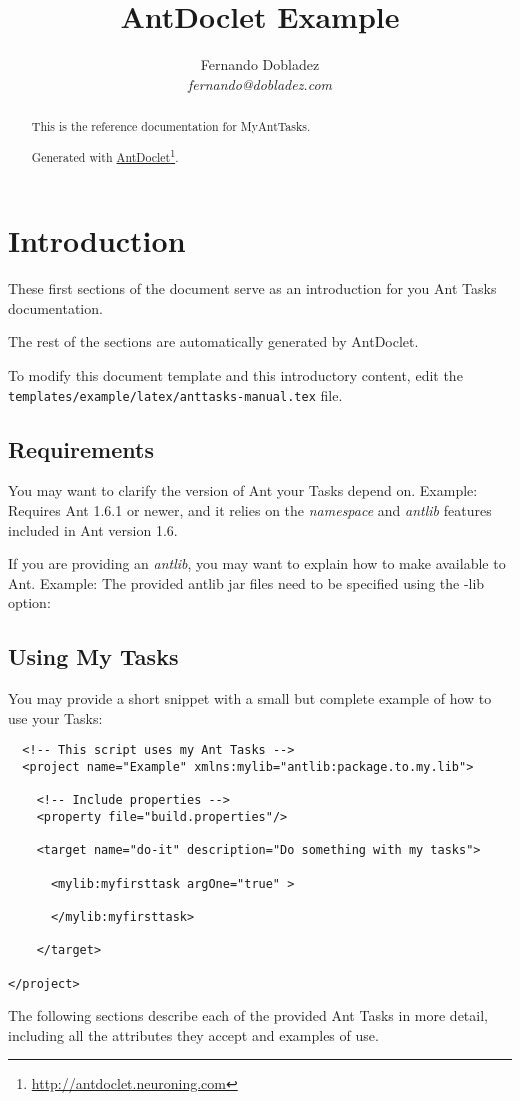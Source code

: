 \documentclass[letterpaper,11pt,oneside]{article}
\title{AntDoclet Example}
\author{Fernando Dobladez\\\smaller\slshape{}fernando@dobladez.com}
\newcommand{\webLink}[2]{\href{#2}{#1}\footnote{\href{#2}{#2}}}
\begin{document}
\maketitle %
\newpage
\begin{abstract}
  This is the reference documentation for MyAntTasks.

  Generated with \webLink{AntDoclet}{http://antdoclet.neuroning.com}.
\end{abstract}

\tableofcontents
\newpage


\section{Introduction}
These first sections of the document serve as an introduction for you
Ant Tasks documentation.

The rest of the sections are automatically generated by AntDoclet.

To modify this document template and this introductory content, edit
the \texttt{templates/example/latex/anttasks-manual.tex} file.

\subsection{Requirements}
You may want to clarify the version of Ant your Tasks depend on.
Example: Requires Ant 1.6.1 or newer, and it relies on the  \emph{namespace}
and \emph{antlib} features included in Ant version 1.6.

If you are providing an \emph{antlib}, you may want to explain how to
make available to Ant. Example: The provided antlib jar files need to
be specified using the -lib option:

\subsection{Using My Tasks}
You may provide a short snippet with a small but complete example of how
to use your Tasks:

\begin{lstlisting}
  <!-- This script uses my Ant Tasks -->
  <project name="Example" xmlns:mylib="antlib:package.to.my.lib">

    <!-- Include properties -->
    <property file="build.properties"/>

    <target name="do-it" description="Do something with my tasks">

      <mylib:myfirsttask argOne="true" >

      </mylib:myfirsttask>

    </target>

</project>
\end{lstlisting}


\vspace{2cm}
The following sections describe each of the provided Ant Tasks in
more detail, including all the attributes they accept and examples of
use.



\end{document}
